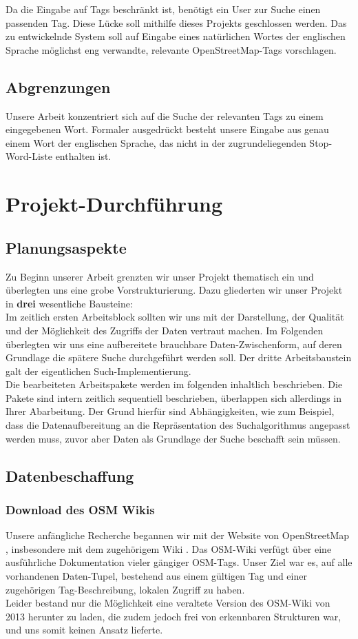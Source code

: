 \documentclass[12pt,pdftex,a4paper]{article}
\begin{document}
Da die Eingabe auf Tags beschränkt ist, benötigt ein User zur Suche einen passenden Tag. Diese Lücke soll mithilfe dieses Projekts geschlossen werden. Das zu entwickelnde System soll auf Eingabe eines natürlichen Wortes der englischen Sprache möglichst eng verwandte, relevante OpenStreetMap-Tags vorschlagen.

\subsection{Abgrenzungen}
Unsere Arbeit konzentriert sich auf die Suche der relevanten Tags zu einem eingegebenen Wort. Formaler ausgedrückt besteht unsere Eingabe aus genau einem Wort der englischen Sprache, das nicht in der zugrundeliegenden Stop-Word-Liste enthalten ist.


\section{Projekt-Durchführung}
\subsection{Planungsaspekte}
Zu Beginn unserer Arbeit grenzten wir unser Projekt thematisch ein und überlegten uns eine grobe Vorstrukturierung.
Dazu gliederten wir unser Projekt in \textbf{drei} wesentliche Bausteine:\\
Im zeitlich ersten Arbeitsblock sollten wir uns mit der Darstellung, der Qualität und der Möglichkeit des Zugriffs der Daten vertraut machen. Im Folgenden überlegten wir uns eine aufbereitete brauchbare Daten-Zwischenform, auf deren Grundlage die spätere Suche durchgeführt werden soll. Der dritte Arbeitsbaustein galt der eigentlichen Such-Implementierung.\\
Die bearbeiteten Arbeitspakete werden im folgenden inhaltlich beschrieben. Die Pakete sind intern zeitlich sequentiell beschrieben, überlappen sich allerdings in Ihrer Abarbeitung. Der Grund hierfür sind Abhängigkeiten, wie zum Beispiel, dass die Datenaufbereitung an die Repräsentation des Suchalgorithmus angepasst werden muss, zuvor aber Daten als Grundlage der Suche beschafft sein müssen.

\subsection{Datenbeschaffung}
\subsubsection{Download des OSM Wikis}
Unsere anfängliche Recherche begannen wir mit der Website von OpenStreetMap \cite{WebsiteOSM}, insbesondere mit dem zugehörigem Wiki \cite{WebsiteOSMWiki}. Das OSM-Wiki verfügt über eine ausführliche Dokumentation vieler gängiger OSM-Tags. Unser Ziel war es, auf alle vorhandenen Daten-Tupel, bestehend aus einem gültigen Tag und einer zugehörigen Tag-Beschreibung, lokalen Zugriff zu haben.
\\
Leider bestand nur die Möglichkeit eine veraltete Version des OSM-Wiki von 2013 herunter zu laden, die zudem jedoch frei von erkennbaren Strukturen war, und uns somit keinen Ansatz lieferte. 
\\
\end{document}
